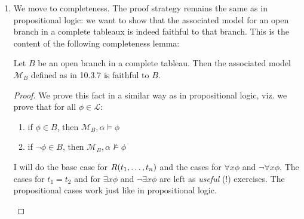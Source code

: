 	\begin{enumerate}[\thesection.1]

		\item We move to completeness. The proof strategy
                  remains the same as in propositional logic: we want
                  to show that the associated model for an open branch
                  in a complete tableaux is indeed faithful to that
                  branch. This is the content of the following
                  completeness lemma:

                  \begin{lemma}
                    Let $B$ be an open branch in a complete
                    tableau. Then the associated model $\mathcal{M}_B$
                    defined as in 10.3.7 is faithful to $B$. 
                  \end{lemma}
                  \begin{proof}
                    We prove this fact in a similar way as in
                    propositional logic, viz. we prove that for all
                    $\phi\in\mathcal{L}$:
                    \begin{enumerate}[1.]

                      \item if $\phi\in B$, then
                        $\mathcal{M}_B,\alpha\vDash\phi$

                        \item if $\neg\phi\in B$, then
                          $\mathcal{M}_B,\alpha\nvDash\phi$ 
                      
                        \end{enumerate}

                        I will do the base case for $R(t_1,
                        \mathellipsis, t_n)$ and the cases for
                        $\forall x\phi$ and $\neg\forall x\phi$. The
                        cases for $t_1=t_2$ and for $\exists x\phi$ and
                        $\neg\exists x\phi$ are left as \emph{useful} (!)
                        exercises. The propositional cases work just
                        like in propositional logic.

                        \begin{enumerate}[(i)]


\end{enumerate}
\end{proof}
\end{enumerate}
